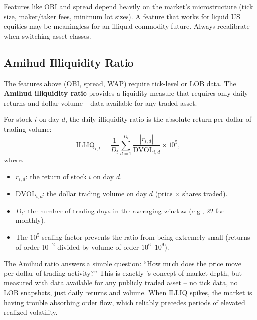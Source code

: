 \begin{warning}
Features like OBI and spread depend heavily on the market's microstructure (tick size, maker/taker fees, minimum lot sizes).
A feature that works for liquid US equities may be meaningless for an illiquid commodity future.
Always recalibrate when switching asset classes.
\end{warning}

\subsection{Amihud Illiquidity Ratio}\label{sec:feat-amihud}

The features above (OBI, spread, WAP) require tick-level or LOB data.
The \textbf{Amihud illiquidity ratio} \citep{Amihud2002} provides a liquidity measure that requires only daily returns and dollar volume -- data available for any traded asset.

\begin{definition}
\label{def:amihud}
For stock $i$ on day $d$, the daily illiquidity ratio is the absolute return per dollar of trading volume:
\begin{equation}\label{eq:amihud}
\text{ILLIQ}_{i,t} = \frac{1}{D_t}\sum_{d=1}^{D_t} \frac{|r_{i,d}|}{\text{DVOL}_{i,d}} \times 10^5,
\end{equation}
where:
\begin{itemize}[nosep]
  \item $r_{i,d}$: the return of stock $i$ on day $d$.
  \item $\text{DVOL}_{i,d}$: the dollar trading volume on day $d$ (price $\times$ shares traded).
  \item $D_t$: the number of trading days in the averaging window (e.g., 22 for monthly).
  \item The $10^5$ scaling factor prevents the ratio from being extremely small (returns of order $10^{-2}$ divided by volume of order $10^{6}$--$10^{9}$).
\end{itemize}
\end{definition}

\begin{intuition}
The Amihud ratio answers a simple question: ``How much does the price move per dollar of trading activity?''
This is exactly \citeauthor{Kyle1985}'s concept of market depth, but measured with data available for any publicly traded asset -- no tick data, no LOB snapshots, just daily returns and volume.
When ILLIQ spikes, the market is having trouble absorbing order flow, which reliably precedes periods of elevated realized volatility.
\end{intuition}

